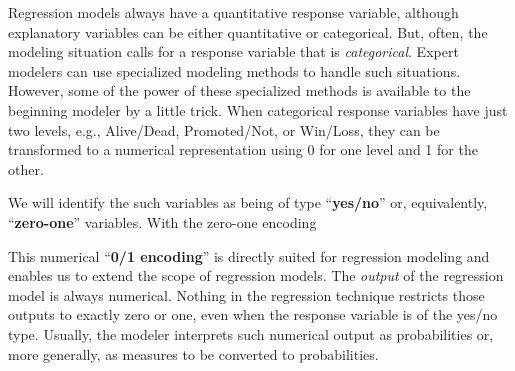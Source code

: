 \documentclass[
  letterpaper,
  DIV=11,
  numbers=noendperiod,
  oneside]{scrreprt}
\begin{document}
Regression models always have a quantitative response variable, although
explanatory variables can be either quantitative or categorical. But,
often, the modeling situation calls for a response variable that is
\emph{categorical}. Expert modelers can use specialized modeling methods
to handle such situations. However, some of the power of these
specialized methods is available to the beginning modeler by a little
trick. When categorical response variables have just two levels, e.g.,
Alive/Dead, Promoted/Not, or Win/Loss, they can be transformed to a
numerical representation using 0 for one level and 1 for the other.

We will identify the such variables as being of type ``\textbf{yes/no}''
or, equivalently, ``\textbf{zero-one}'' variables. With the zero-one
encoding

This numerical ``\textbf{0/1 encoding}'' is directly suited for
regression modeling and enables us to extend the scope of regression
models. The \emph{output} of the regression model is always numerical.
Nothing in the regression technique restricts those outputs to exactly
zero or one, even when the response variable is of the yes/no type.
Usually, the modeler interprets such numerical output as probabilities
or, more generally, as measures to be converted to probabilities.
\end{document}

